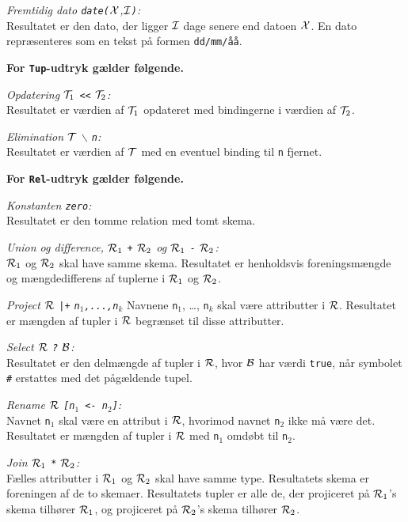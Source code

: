 {\em Fremtidig dato \verb"date("${\cal X}$,${\cal I}$\verb")":}\\
Resultatet er den dato, der ligger ${\cal I}$ dage senere end datoen ${\cal X}$.
En dato repr\ae{}senteres som en tekst p\aa{} formen {\tt dd/mm/\aa{}\aa{}}.

{\bf For \verb"Tup"-udtryk g\ae{}lder f\o{}lgende.}

{\em Opdatering ${\cal T}_1$ \verb"<<" ${\cal T}_2$:}\\
Resultatet er v\ae{}rdien af ${\cal T}_1$ opdateret med
bindingerne i v\ae{}rdien af ${\cal T}_2$.

{\em Elimination $\cal T$ $\backslash$ \verb"n":}\\
Resultatet er v\ae{}rdien af $\cal T$ med en eventuel binding
til \verb"n" fjernet.

{\bf For \verb"Rel"-udtryk g\ae{}lder f\o{}lgende.}

{\em Konstanten \verb"zero":}\\
Resultatet er den tomme relation med tomt skema.

{\em Union og difference, ${\cal R}_1$ \verb"+" ${\cal R}_2$ og
${\cal R}_1$ \verb"-" ${\cal R}_2$:}\\
${\cal R}_1$ og ${\cal R}_2$ skal have samme skema. Resultatet er
henholdsvis foreningsm\ae{}ngde og m\ae{}ngdedifferens af tuplerne
i ${\cal R}_1$ og ${\cal R}_2$.

{\em Project $\cal R$ \verb"|+" \verb"n"$_1$\verb",...,n"$_k$}
Navnene \verb"n"$_1$, \ldots, \verb"n"$_k$ skal v\ae{}re attributter
i $\cal R$. Resultatet er m\ae{}ngden af tupler i $\cal R$ begr\ae{}nset
til disse attributter.

{\em Select $\cal R$ \verb"?" $\cal B$:}\\
Resultatet er den delm\ae{}ngde af tupler i $\cal R$, hvor
$\cal B$ har v\ae{}rdi \verb"true", n\aa{}r symbolet \verb"#" erstattes
med det p\aa{}g\ae{}ldende tupel.

{\em Rename $\cal R$ \verb"[n"$_1$\verb" <- n"$_2$\verb"]":}\\
Navnet \verb"n"$_1$ skal v\ae{}re en attribut i $\cal R$, hvorimod
navnet \verb"n"$_2$ ikke m\aa{} v\ae{}re det. Resultatet er
m\ae{}ngden af tupler i $\cal R$ med \verb"n"$_1$ omd\o{}bt
til \verb"n"$_2$.

{\em Join ${\cal R}_1$ \verb"*" ${\cal R}_2$:}\\
F\ae{}lles attributter i ${\cal R}_1$ og ${\cal R}_2$ skal have samme type.
Resultatets skema er foreningen af de to skemaer. 
Resultatets tupler er alle de, der projiceret p\aa{}
${\cal R}_1$'s skema tilh\o{}rer ${\cal R}_1$, og projiceret p\aa{}
${\cal R}_2$'s skema tilh\o{}rer ${\cal R}_2$.

